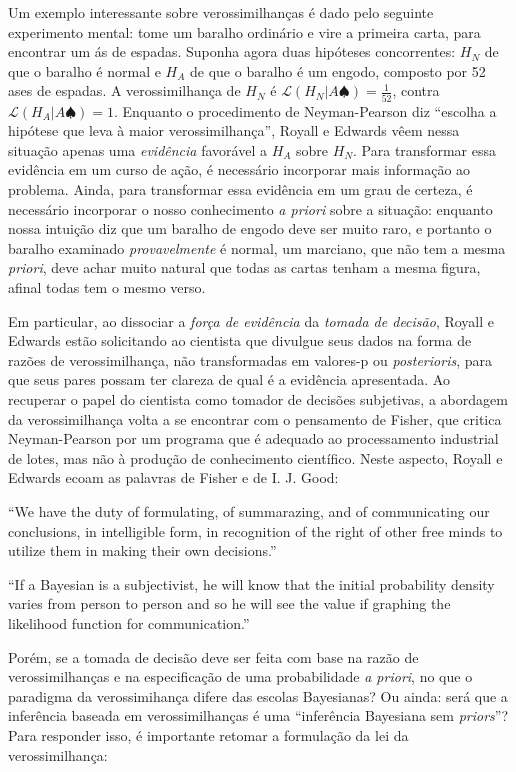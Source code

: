 Um exemplo interessante sobre verossimilhanças é dado 
pelo seguinte experimento mental: tome um baralho ordinário e vire a primeira carta,
para encontrar um ás de espadas. Suponha agora duas hipóteses concorrentes: $H_N$ de que o baralho é normal e $H_A$
de que o baralho é um engodo, composto por 52 ases de espadas. A verossimilhança de $H_N$ é 
$\mathcal{L} (H_N|A \spadesuit) = \frac{1}{52}$, contra $\mathcal{L} (H_A | A \spadesuit) = 1 $. Enquanto o procedimento
de Neyman-Pearson diz ``escolha a hipótese que leva à maior verossimilhança'', Royall e Edwards vêem nessa situação
apenas uma {\em evidência} favorável a $H_A$ sobre $H_N$. Para transformar essa evidência em um curso de ação, é necessário
incorporar mais informação ao problema. 
Ainda, para transformar essa evidência em um grau de certeza,
é necessário incorporar o nosso conhecimento {\em a priori} sobre a situação: enquanto nossa intuição diz
que um baralho de engodo deve ser muito raro, e portanto o baralho examinado {\em provavelmente} é normal, um marciano,
que não tem a mesma {\em priori}, deve achar muito natural que todas as cartas tenham a mesma figura, afinal todas tem o mesmo
verso. 

Em particular, 
ao dissociar a {\em força de evidência} da {\em tomada de decisão}, Royall e Edwards estão solicitando ao cientista
que divulgue seus dados na forma de razões de verossimilhança, não transformadas em valores-p ou {\em posterioris}, para que
seus pares possam ter clareza de qual é a evidência apresentada. 
Ao recuperar o papel do cientista como tomador de decisões subjetivas, a abordagem da verossimilhança volta a se encontrar
com o pensamento de Fisher, que critica Neyman-Pearson por um programa que é adequado ao processamento industrial de lotes,
mas não à produção de conhecimento científico. Neste aspecto, Royall e Edwards ecoam as palavras de Fisher e de I. J. Good:

``We have the duty of formulating, of summarazing, and of communicating our conclusions, in intelligible form, in
recognition of the right of other free minds to utilize them in making their own decisions.'' \citep{Fisher1955}

``If a Bayesian is a subjectivist, he will know that the initial probability density varies from person to person and
so he will see the value if graphing the likelihood function for communication.'' \citep{Good76}

Porém, se a tomada de decisão deve ser feita com base na razão de verossimilhanças e na especificação de uma 
probabilidade {\em a priori}, no que o paradigma da verossimihança difere das escolas Bayesianas? Ou ainda: será que a 
inferência baseada em verossimilhanças é uma ``inferência Bayesiana sem {\em priors}''? Para responder isso,
é importante retomar a formulação da lei da verossimilhança:

